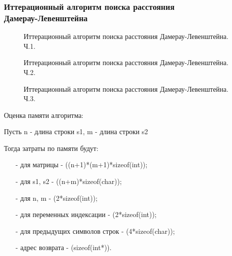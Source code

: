 \subsubsection{Иттерационный алгоритм поиска расстояния\\ Дамерау-Левенштейна}
\begin{figure}[!h]
	\centering
	\captionsetup{justification=centering}
    \def\svgscale{0.75}
	
	\caption{Иттерационный алгоритм поиска расстояния Дамерау-Левенштейна. Ч.1.}
	\label{fig:d21}
\end{figure}
\begin{figure}[h]
	\centering
	\captionsetup{justification=centering}
    \def\svgscale{0.75}
	
	\caption{Иттерационный алгоритм поиска расстояния Дамерау-Левенштейна. Ч.2.}
	\label{fig:d22}
\end{figure}
\begin{figure}[!h]
	\centering
	\captionsetup{justification=centering}
    \def\svgscale{0.4}
	
	\caption{Иттерационный алгоритм поиска расстояния Дамерау-Левенштейна. Ч.3.}
	\label{fig:d23}
\end{figure}
\pagebreak
Оценка памяти алгоритма:\par
Пусть n - длина строки s1, m - длина строки s2\par
Тогда затраты по памяти будут:\par
\begin{itemize}
	\item[-] для матрицы - ((n+1)*(m+1)*sizeof(int));
	\item[-] для s1, s2 - ((n+m)*sizeof(char));
	\item[-] для n, m - (2*sizeof(int));
	\item[-] для переменных индексации - (2*sizeof(int));
	\item[-] для предыдущих символов строк - (4*sizeof(char));
	\item[-] адрес возврата - (sizeof(int*)).
\end{itemize}
\pagebreak
